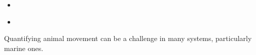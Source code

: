 \documentclass{article}
\begin{document}


\begin{itemize}
\item 
\end{itemize}

\begin{itemize}
\item 
\end{itemize}

\noindent Quantifying animal movement can be a challenge in many systems, particularly marine ones.
\end{document}
